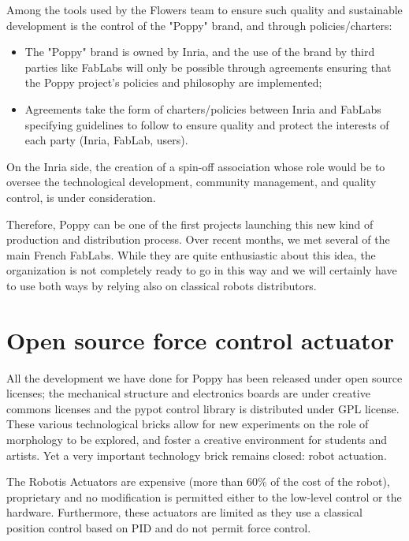 Among the tools used by the Flowers team to ensure such quality and sustainable development is the control of the "Poppy" brand, and through policies/charters:

\begin{itemize}
\item The "Poppy" brand is owned by Inria, and the use of the brand by third parties like FabLabs will only be possible through agreements ensuring that the Poppy project’s policies and philosophy are implemented;
\item Agreements take the form of charters/policies between Inria and FabLabs specifying guidelines to follow to ensure quality and protect the interests of each party (Inria, FabLab, users).
\end{itemize}

On the Inria side, the creation of a spin-off association whose role would be to  oversee the technological development, community management, and quality control, is under consideration.



Therefore, Poppy can be one of the first projects launching this new kind of production and distribution process. Over recent months, we met several of the main French FabLabs. While they are quite enthusiastic about this idea, the organization is not completely ready to go in this way and we will certainly have to use both ways by relying also on classical robots distributors.





\section{Open source force control actuator} %
\label{sec:open_sourcing_the_robotic_actuations}

All the development we have done for Poppy has been released under open source licenses; the mechanical structure and electronics boards are under creative commons licenses and the pypot control library is distributed under GPL license. These various technological bricks allow for new experiments on the role of morphology to be explored, and foster a creative environment for students and artists. Yet a very important technology brick remains closed: robot actuation.

The Robotis Actuators are expensive (more than 60\% of the cost of the robot), proprietary and no modification is permitted either to the low-level control or the hardware. Furthermore, these actuators are limited as they use a classical position control based on PID and do not permit force control.

